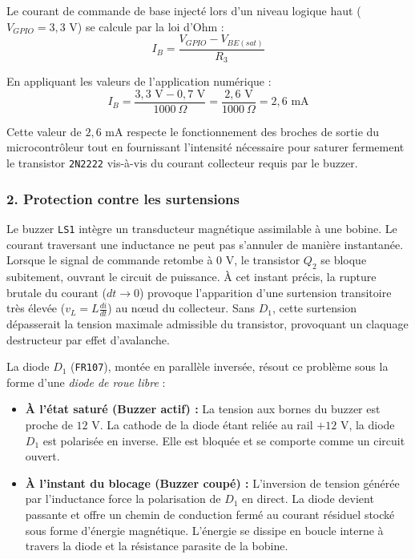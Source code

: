 Le courant de commande de base injecté lors d'un niveau logique haut ($V_{GPIO} = 3{,}3\text{ V}$) se calcule par la loi d'Ohm :
\begin{equation}
    I_B = \frac{V_{GPIO} - V_{BE(sat)}}{R_3}
\end{equation}

En appliquant les valeurs de l'application numérique :
\begin{equation}
    I_B = \frac{3{,}3\text{ V} - 0{,}7\text{ V}}{1000\ \Omega} = \frac{2{,}6\text{ V}}{1000\ \Omega} = 2{,}6\text{ mA}
\end{equation}

Cette valeur de $2{,}6\text{ mA}$ respecte le fonctionnement des broches de sortie du microcontrôleur
tout en fournissant l'intensité nécessaire pour saturer fermement le transistor \texttt{2N2222}
vis-à-vis du courant collecteur requis par le buzzer.

\subsubsection*{2. Protection contre les surtensions}
Le buzzer \texttt{LS1} intègre un transducteur magnétique assimilable à une bobine. 
Le courant traversant une inductance ne peut pas s'annuler de manière instantanée.
Lorsque le signal de commande retombe à $0\text{ V}$, le transistor $Q_2$ se bloque subitement, 
ouvrant le circuit de puissance. À cet instant précis, la rupture brutale du courant ($dt \to 0$) 
provoque l'apparition d'une surtension transitoire très élevée ($v_L = L \frac{di}{dt}$) au nœud du collecteur.
Sans $D_1$, cette surtension dépasserait la tension maximale admissible du transistor, 
provoquant un claquage destructeur par effet d'avalanche.

La diode $D_1$ (\texttt{FR107}), montée en parallèle inversée, résout ce problème sous la forme 
d'une \textit{diode de roue libre} :
\begin{itemize}
    \item \textbf{À l'état saturé (Buzzer actif) :} La tension aux bornes du buzzer est proche de $12\text{ V}$. La cathode de la diode étant reliée au rail $+12\text{ V}$, la diode $D_1$ est polarisée en inverse. Elle est bloquée et se comporte comme un circuit ouvert.
    \item \textbf{À l'instant du blocage (Buzzer coupé) :} L'inversion de tension générée par l'inductance force la polarisation de $D_1$ en direct. La diode devient passante et offre un chemin de conduction fermé au courant résiduel stocké sous forme d'énergie magnétique. L'énergie se dissipe en boucle interne à travers la diode et la résistance parasite de la bobine.
\end{itemize}

